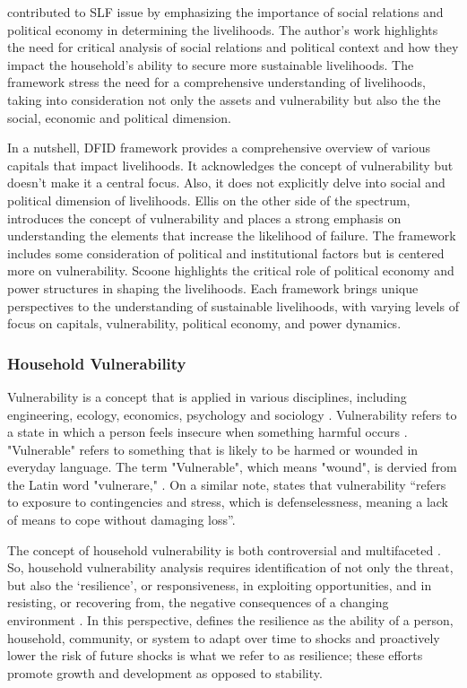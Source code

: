\cite{scoones2013livelihoods} contributed to SLF issue by emphasizing the importance of social relations and political economy in determining the livelihoods. The author's work highlights the need for critical analysis of social relations and political context and how they impact the household's ability to secure more sustainable livelihoods. The framework stress the need for a comprehensive understanding of livelihoods, taking into consideration not only the assets and vulnerability but also the the social, economic and political dimension.\par

In a nutshell, DFID framework provides a comprehensive overview of various capitals that impact livelihoods. It acknowledges the concept of vulnerability but doesn't make it a central focus. Also, it does not explicitly delve into social and political dimension of livelihoods. Ellis on the other side of the spectrum, introduces the concept of vulnerability and places a strong emphasis on understanding the elements that increase the likelihood of failure. The framework includes some consideration of political and institutional factors but is centered more on vulnerability. Scoone highlights the critical role of political economy and power structures in shaping the livelihoods. Each framework brings unique perspectives to the understanding of sustainable livelihoods, with varying levels of focus on capitals, vulnerability, political economy, and power dynamics.\par

\subsubsection{Household Vulnerability}
Vulnerability is a concept that is applied in various disciplines, including engineering, ecology, economics, psychology and sociology \citep{fang2016rural}. Vulnerability refers to a state in which a person feels insecure when something harmful occurs \citep{chambers2006vulnerability}. "Vulnerable" refers to something that is likely to be harmed or wounded in everyday language. The term "Vulnerable", which means "wound", is dervied from the Latin word "vulnerare," \citep{calvo2005measuring}. On a similar note, \cite{chambers1989editorial}  states that vulnerability “refers to exposure to contingencies and stress, which is defenselessness, meaning a lack of means to cope without damaging loss”.\par

The concept of household vulnerability is both controversial and multifaceted \citep{zhang2020capital}. So, household vulnerability analysis requires identification of not only the threat, but also the ‘resilience’, or responsiveness, in exploiting opportunities, and in resisting, or recovering from, the negative consequences of a changing environment \citep{moser1998asset}. In this perspective, \cite{bernier2014resilience} defines the resilience as the ability of a person, household, community, or system to adapt over time to shocks and proactively lower the risk of future shocks is what we refer to as resilience; these efforts promote growth and development as opposed to stability.\par

